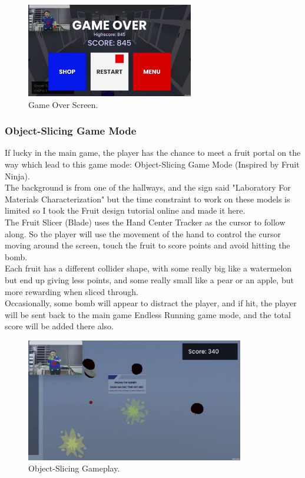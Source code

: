 \documentclass[12pt]{article}
\begin{document}
\begin{figure}[H]
    \centering
    \includegraphics[width=0.65\textwidth]{game8.jpg}
    \caption{Game Over Screen.}
\end{figure}

\subsubsection{Object-Slicing Game Mode}
\hspace*{1.5em} If lucky in the main game, the player has the chance to meet a fruit portal on the way which lead to this game mode: Object-Slicing Game Mode (Inspired by Fruit Ninja).\\

The background is from one of the hallways, and the sign said "Laboratory For Materials Characterization" but the time constraint to work on these models is limited so I took the Fruit design tutorial online and made it here.\\

The Fruit Slicer (Blade) uses the Hand Center Tracker as the cursor to follow along. So the player will use the movement of the hand to control the cursor moving around the screen, touch the fruit to score points and avoid hitting the bomb.\\

Each fruit has a different collider shape, with some really big like a watermelon but end up giving less points, and some really small like a pear or an apple, but more rewarding when sliced through.\\

Occasionally, some bomb will appear to distract the player, and if hit, the player will be sent back to the main game Endless Running game mode, and the total score will be added there also.

\begin{figure}[h]
    \centering
    \includegraphics[width=0.85\textwidth]{game3.jpg}
    \caption{Object-Slicing Gameplay.}
\end{figure}
\end{document}
